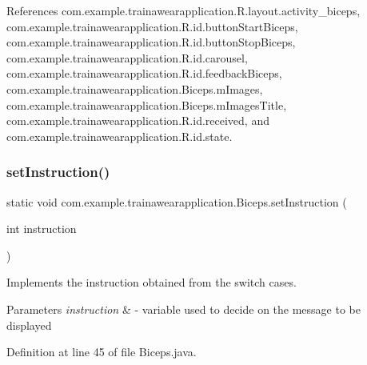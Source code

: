 References com.\+example.\+trainawearapplication.\+R.\+layout.\+activity\+\_\+biceps, com.\+example.\+trainawearapplication.\+R.\+id.\+button\+Start\+Biceps, com.\+example.\+trainawearapplication.\+R.\+id.\+button\+Stop\+Biceps, com.\+example.\+trainawearapplication.\+R.\+id.\+carousel, com.\+example.\+trainawearapplication.\+R.\+id.\+feedback\+Biceps, com.\+example.\+trainawearapplication.\+Biceps.\+m\+Images, com.\+example.\+trainawearapplication.\+Biceps.\+m\+Images\+Title, com.\+example.\+trainawearapplication.\+R.\+id.\+received, and com.\+example.\+trainawearapplication.\+R.\+id.\+state.

\mbox{\label{classcom_1_1example_1_1trainawearapplication_1_1_biceps_a05106a83eaf742a4c3e4d7c9a40d0e11}} 
\subsubsection{\texorpdfstring{setInstruction()}{setInstruction()}}
{\footnotesize\ttfamily static void com.\+example.\+trainawearapplication.\+Biceps.\+set\+Instruction (\begin{DoxyParamCaption}\item[{int}]{instruction }\end{DoxyParamCaption})\hspace{0.3cm}{\ttfamily [static]}}



Implements the instruction obtained from the switch cases. 


\begin{DoxyParams}{Parameters}
{\em instruction} & -\/ variable used to decide on the message to be displayed \\
\hline
\end{DoxyParams}


Definition at line 45 of file Biceps.\+java.


\begin{DoxyCode}{0}

\end{DoxyCode}


